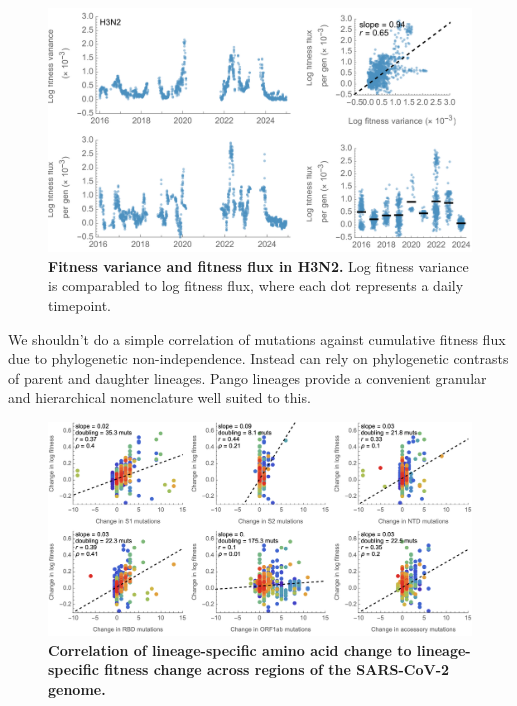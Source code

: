 \documentclass[11pt,oneside,letterpaper]{article}
\begin{document}
\begin{figure}[h]
	\centering
	\includegraphics[width=1.0\textwidth]{figures/h3n2_clades_fitness_variance_vs_flux}
	\caption{\textbf{Fitness variance and fitness flux in H3N2.}
  Log fitness variance is comparabled to log fitness flux, where each dot represents a daily timepoint.
	}
	\label{h3n2_clades_fitness_variance_vs_flux}
\end{figure}

We shouldn't do a simple correlation of mutations against cumulative fitness flux due to phylogenetic non-independence.
Instead can rely on phylogenetic contrasts of parent and daughter lineages.
Pango lineages provide a convenient granular and hierarchical nomenclature well suited to this.

\begin{figure}[h]
	\centering
	\includegraphics[width=1.0\textwidth]{figures/sarscov2_lineage_delta_fitness_across_genome}
	\caption{\textbf{Correlation of lineage-specific amino acid change to lineage-specific fitness change across regions of the SARS-CoV-2 genome.}
	}
	\label{sarscov2_lineage_delta_fitness_across_genome}
\end{figure}
\end{document}
